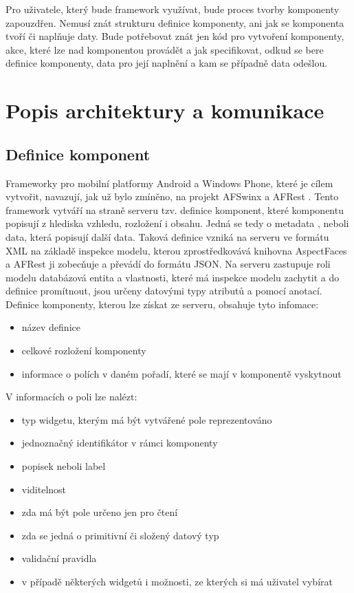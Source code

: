 Pro uživatele, který bude framework využívat, bude proces tvorby komponenty zapouzdřen. Nemusí znát strukturu definice komponenty, ani jak se komponenta tvoří či naplňuje daty. Bude potřebovat znát jen kód pro vytvoření komponenty, akce, které lze nad komponentou provádět a jak specifikovat, odkud se bere definice komponenty, data pro její naplnění a kam se případně data odešlou.

\section{Popis architektury a komunikace}
\subsection{Definice komponent}
Frameworky pro mobilní platformy Android a Windows Phone, které je cílem vytvořit, navazují, jak už bylo zmíněno, na projekt AFSwinx a AFRest \cite{tomasek-thesis}. Tento framework vytváří na straně serveru tzv. definice komponent, které komponentu popisují z hlediska vzhledu, rozložení i obsahu. Jedná se tedy o metadata \cite{metadata}, neboli data, která popisují další data. Taková definice vzniká na serveru ve formátu XML na základě inspekce modelu, kterou zprostředkovává knihovna AspectFaces a AFRest ji zobecňuje a převádí do formátu JSON. Na serveru zastupuje roli modelu databázová entita a vlastnosti, které má inspekce modelu zachytit a do definice promítnout, jsou určeny datovými typy atributů a pomocí anotací.
Definice komponenty, kterou lze získat ze serveru, obsahuje tyto infomace:
\begin{itemize}
\item název definice
\item celkové rozložení komponenty
\item informace o polích v daném pořadí, které se mají v komponentě vyskytnout
\end{itemize}
V informacích o poli lze nalézt:
\begin{itemize}
\item typ widgetu, kterým má být vytvářené pole reprezentováno
\item jednoznačný identifikátor v rámci komponenty
\item popisek neboli label
\item viditelnost
\item zda má být pole určeno jen pro čtení
\item zda se jedná o primitivní či složený datový typ
\item validační pravidla
\item v případě některých widgetů i možnosti, ze kterých si má uživatel vybírat
\end{itemize}

